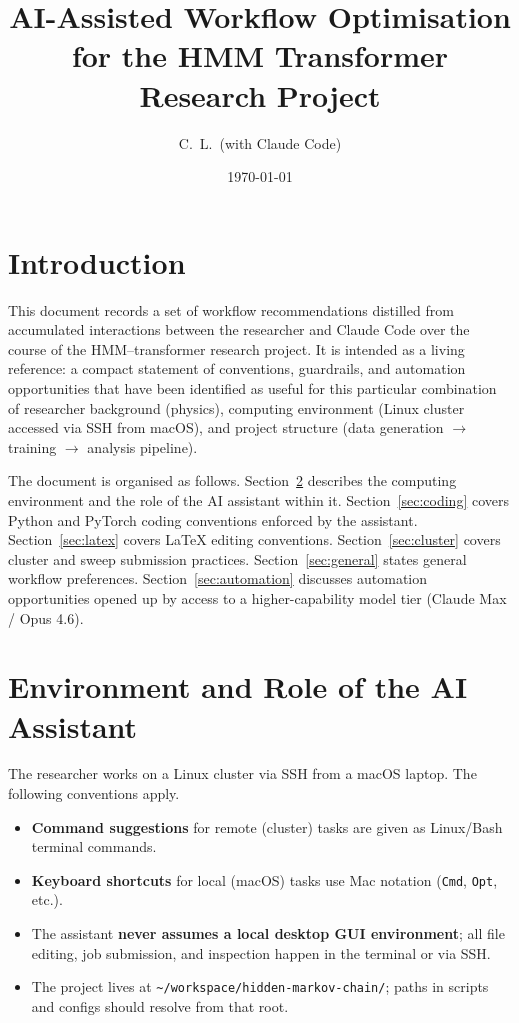 \documentclass[11pt]{article}
\title{AI-Assisted Workflow Optimisation\\for the HMM Transformer Research Project}
\author{C.~L.\ (with Claude Code)}
\date{\today}
\begin{document}
\maketitle
\tableofcontents
\bigskip

\section{Introduction}

This document records a set of workflow recommendations distilled from
accumulated interactions between the researcher and Claude Code over the
course of the HMM--transformer research project.  It is intended as a
living reference: a compact statement of conventions, guardrails, and
automation opportunities that have been identified as useful for this
particular combination of researcher background (physics), computing
environment (Linux cluster accessed via SSH from macOS), and project
structure (data generation $\to$ training $\to$ analysis pipeline).

The document is organised as follows.  Section~\ref{sec:env} describes
the computing environment and the role of the AI assistant within it.
Section~\ref{sec:coding} covers Python and PyTorch coding conventions
enforced by the assistant.  Section~\ref{sec:latex} covers \LaTeX{}
editing conventions.  Section~\ref{sec:cluster} covers cluster and
sweep submission practices.  Section~\ref{sec:general} states general
workflow preferences.  Section~\ref{sec:automation} discusses
automation opportunities opened up by access to a higher-capability
model tier (Claude Max / Opus 4.6).

\section{Environment and Role of the AI Assistant}
\label{sec:env}

The researcher works on a Linux cluster via SSH from a macOS laptop.
The following conventions apply.

\begin{itemize}[leftmargin=1.5em]
  \item \textbf{Command suggestions} for remote (cluster) tasks are given
        as Linux/Bash terminal commands.
  \item \textbf{Keyboard shortcuts} for local (macOS) tasks use Mac
        notation (\texttt{Cmd}, \texttt{Opt}, etc.).
  \item The assistant \textbf{never assumes a local desktop GUI
        environment}; all file editing, job submission, and inspection
        happen in the terminal or via SSH.
  \item The project lives at
        \texttt{\textasciitilde/workspace/hidden-markov-chain/};
        paths in scripts and configs should resolve from that root.
\end{itemize}
\end{document}
